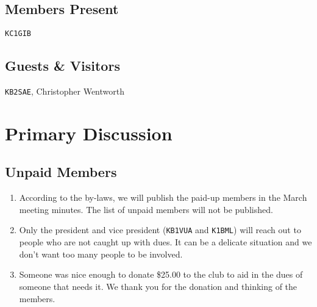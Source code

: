 \documentclass[10pt,letterpaper]{article}
\begin{document}
\subsection{Members Present}
\texttt{KC1GIB}

\subsection{Guests \& Visitors}
\texttt{KB2SAE},
Christopher Wentworth

\section{Primary Discussion}

\subsection{Unpaid Members}
\begin{enumerate}
\item According to the by-laws, we will publish the paid-up members in the March meeting minutes. The list of unpaid members will not be published.
\item Only the president and vice president (\texttt{KB1VUA} and \texttt{K1BML}) will reach out to people who are not caught up with dues. It can be a delicate situation and we don't want too many people to be involved.
\item Someone was nice enough to donate \$25.00 to the club to aid in the dues of someone that needs it. We thank you for the donation and thinking of the members.
\end{enumerate}
\end{document}
